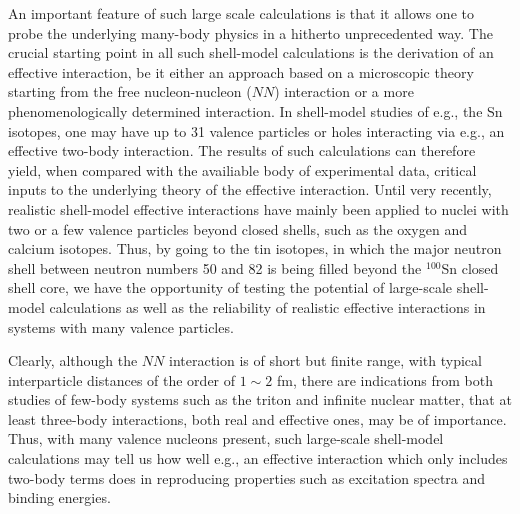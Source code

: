 An important feature of such large scale calculations
is that it allows one to probe the underlying many-body
physics in a hitherto unprecedented way.
The crucial starting point in all such shell-model 
calculations is
the derivation of an effective interaction, be it
either an approach based on a microscopic theory
starting from the free nucleon-nucleon ($NN$) interaction or a more 
phenomenologically determined interaction. 
In shell-model studies of e.g., the Sn isotopes, one may have
up to 31 valence particles or holes interacting via e.g.,
an effective two-body interaction. The results of such 
calculations can therefore yield, when compared with 
the availiable body of experimental data, critical
inputs to the underlying theory of the effective interaction.
Until very recently, realistic shell-model effective interactions have
mainly been applied to nuclei with two or a few valence particles beyond
closed shells, such as the oxygen and calcium isotopes. Thus, by going to the
tin isotopes, in which the major neutron shell between neutron numbers 50 and
82 is being filled beyond the $^{100}$Sn closed shell core, we have the opportunity
of testing the potential of large-scale 
shell-model calculations as well as the reliability of
realistic effective interactions in systems with many valence particles. 

Clearly, although the $NN$  interaction is of short
but finite range, with typical interparticle
distances of the order of $1\sim 2$ fm, there are  
indications from both studies of few-body systems such as the triton and
infinite nuclear matter, that at least three-body
interactions, both real and effective ones, may be of
importance. 
Thus, with many valence nucleons present, such
large-scale shell-model calculations may
tell us how well e.g., an effective interaction
which only includes two-body terms does in
reproducing properties such as excitation spectra and
binding energies. 

